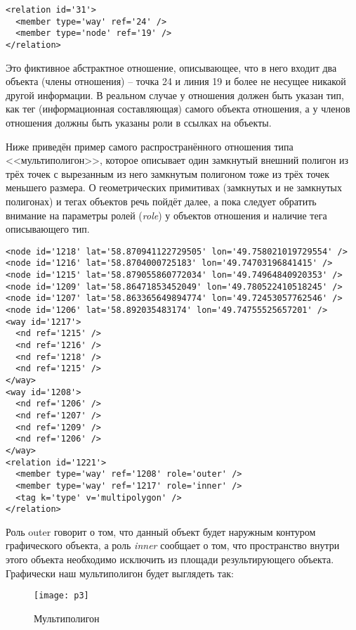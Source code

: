 \small
\begin{verbatim}
<relation id='31'>
  <member type='way' ref='24' />
  <member type='node' ref='19' />
</relation>
\end{verbatim}
\normalsize

Это фиктивное абстрактное отношение, описывающее, что в него входит два 
объекта (члены отношения) -- точка 24 и линия 19 и более не несущее никакой 
другой информации. В реальном случае у отношения должен быть указан тип, как 
тег (информационная составляющая) самого объекта отношения, а у членов 
отношения должны быть указаны роли в ссылках на объекты.

Ниже приведён пример самого распространённого отношения типа <<мультиполигон>>, 
которое описывает один замкнутый внешний полигон из трёх точек с вырезанным из 
него замкнутым полигоном тоже из трёх точек меньшего размера. О геометрических 
примитивах (замкнутых и не замкнутых полигонах) и тегах объектов речь пойдёт 
далее, а пока следует обратить внимание на параметры ролей (\emph{role}) у 
объектов отношения и наличие тега описывающего тип. 

\small
\begin{verbatim}
<node id='1218' lat='58.870941122729505' lon='49.758021019729554' />
<node id='1216' lat='58.8704000725183' lon='49.74703196841415' />
<node id='1215' lat='58.879055860772034' lon='49.74964840920353' />
<node id='1209' lat='58.86471853452049' lon='49.780522410518245' />
<node id='1207' lat='58.863365649894774' lon='49.72453057762546' />
<node id='1206' lat='58.892035483174' lon='49.74755525657201' />
<way id='1217'>
  <nd ref='1215' />
  <nd ref='1216' />
  <nd ref='1218' />
  <nd ref='1215' />
</way>
<way id='1208'>
  <nd ref='1206' />
  <nd ref='1207' />
  <nd ref='1209' />
  <nd ref='1206' />
</way>
<relation id='1221'>
  <member type='way' ref='1208' role='outer' />
  <member type='way' ref='1217' role='inner' />
  <tag k='type' v='multipolygon' />
</relation>
\end{verbatim}
\normalsize

Роль outer говорит о том, что данный объект будет наружным контуром 
графического объекта, а роль \emph{inner} сообщает о том, что пространство 
внутри этого объекта необходимо исключить из площади результирующего объекта. 
Графически наш мультиполигон будет выглядеть так:

\begin{figure}[ht!]
    \center
    \texttt{[image: p3]}
    \caption{Мультиполигон}
    \label{multipoly01}
\end{figure}


